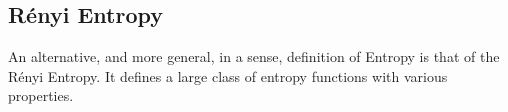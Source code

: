 


\subsection{Rényi Entropy}


An alternative, and more general, in a sense, definition of Entropy is that of the Rényi Entropy. It defines a large class of entropy functions with various properties.


